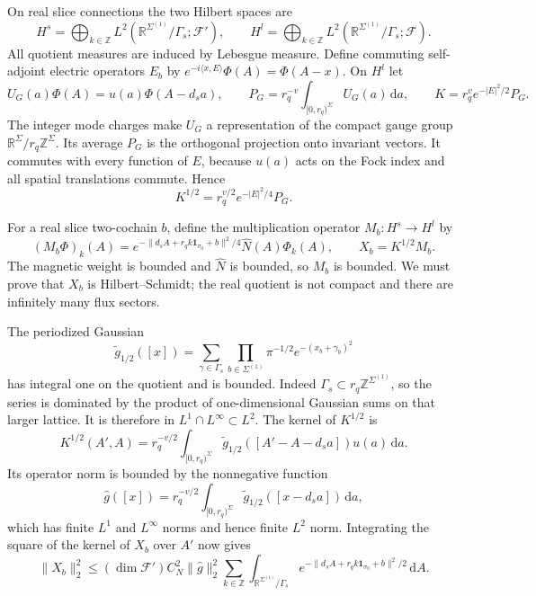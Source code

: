 \documentclass[11pt,letterpaper,reqno]{amsart}
\newcommand{\R}{\mathbb R}
\newcommand{\Z}{\mathbb Z}
\newcommand{\dd}{\mathrm d}
\begin{document}
On real slice connections the two Hilbert spaces are
\[
 H^s=\bigoplus_{k\in\Z}
      L^2(\R^{\Sigma^{(1)}}/\Gamma_s;\mathcal F'),\qquad
 H^l=\bigoplus_{k\in\Z}
      L^2(\R^{\Sigma^{(1)}}/\Gamma_s;\mathcal F).
\]
All quotient measures are induced by Lebesgue measure. Define commuting
self-adjoint electric operators $E_b$ by
$e^{-i\langle x,E\rangle}\Phi(A)=\Phi(A-x)$. On $H^l$ let
\begin{equation}\label{eq:slab-electric-operators}
 U_G(a)\Phi(A)=u(a)\Phi(A-d_sa),\qquad
 P_G=r_q^{-v}\int_{[0,r_q)^{\Sigma}}U_G(a)\,\dd a,
 \qquad K=r_q^ve^{-|E|^2/2}P_G.
\end{equation}
The integer mode charges make $U_G$ a representation of the compact
gauge group $\R^{\Sigma}/r_q\Z^{\Sigma}$. Its average $P_G$ is the
orthogonal projection onto invariant vectors. It commutes with every
function of $E$, because $u(a)$ acts on the Fock index and all spatial
translations commute. Hence
\begin{equation}\label{eq:slab-electric-square-root}
 K^{1/2}=r_q^{v/2}e^{-|E|^2/4}P_G.
\end{equation}

For a real slice two-cochain $b$, define the multiplication operator
$M_b:H^s\to H^l$ by
\begin{equation}\label{eq:slab-magnetic-multiplier}
 (M_b\Phi)_k(A)=
     e^{-\|d_sA+r_qk\mathbf1_{\sigma_0}+b\|^2/4}
                                      \widehat N(A)\Phi_k(A),
 \qquad X_b=K^{1/2}M_b.
\end{equation}
The magnetic weight is bounded and $\widehat N$ is bounded, so $M_b$
is bounded. We must prove that $X_b$ is Hilbert--Schmidt; the real
quotient is not compact and there are infinitely many flux sectors.

The periodized Gaussian
\[
 \widetilde g_{1/2}([x])
   =\sum_{\gamma\in\Gamma_s}\prod_{b\in\Sigma^{(1)}}
                       \pi^{-1/2}e^{-(x_b+\gamma_b)^2}
\]
has integral one on the quotient and is bounded. Indeed
$\Gamma_s\subset r_q\Z^{\Sigma^{(1)}}$, so the series is dominated
by the product of one-dimensional Gaussian sums on that larger lattice.
It is therefore in $L^1\cap L^\infty\subset L^2$. The kernel of
$K^{1/2}$ is
\[
 K^{1/2}(A',A)=r_q^{-v/2}\int_{[0,r_q)^{\Sigma}}
       \widetilde g_{1/2}([A'-A-d_sa])u(a)\,\dd a.
\]
Its operator norm is bounded by the nonnegative function
\[
 \widehat g([x])=r_q^{-v/2}\int_{[0,r_q)^{\Sigma}}
                  \widetilde g_{1/2}([x-d_sa])\,\dd a,
\]
which has finite $L^1$ and $L^\infty$ norms and hence finite $L^2$ norm.
Integrating the square of the kernel of $X_b$ over $A'$ now gives
\begin{equation}\label{eq:slab-shifted-hs}
 \|X_b\|_2^2\le
    (\dim\mathcal F')C_N^2\|\widehat g\|_2^2
       \sum_{k\in\Z}\int_{\R^{\Sigma^{(1)}}/\Gamma_s}
             e^{-\|d_sA+r_qk\mathbf1_{\sigma_0}+b\|^2/2}\,\dd A.
\end{equation}
\end{document}
